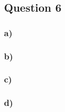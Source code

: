\subsection*{Question 6}


\subsubsection*{a)}
\noindent 


\subsubsection*{b)}
\noindent 


\subsubsection*{c)}
\noindent 


\subsubsection*{d)}
\noindent